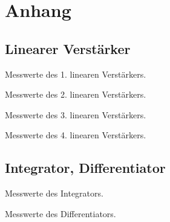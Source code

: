 \section{Anhang}\label{sec:anhang}

\subsection*{Linearer Verst\"arker}

\begin{table}[ht]
  \centering
  \caption{Messwerte des 1. linearen Verstärkers.}
  \label{tab:lin_verst_01}
  
\end{table}

\begin{table}[ht]
  \centering
  \caption{Messwerte des 2. linearen Verstärkers.}
  \label{tab:lin_verst_02}
  
\end{table}

\begin{table}[ht]
  \centering
  \caption{Messwerte des 3. linearen Verstärkers.}
  \label{tab:lin_verst_03}
  
\end{table}

\begin{table}[ht]
  \centering
  \caption{Messwerte des 4. linearen Verstärkers.}
  \label{tab:lin_verst_04}
  
\end{table}

\FloatBarrier
\newpage
\subsection*{Integrator, Differentiator}

\begin{table}[ht]
  \centering
  \caption{Messwerte des Integrators.}
  \label{tab:int}
  
\end{table}

\begin{table}[ht]
  \centering
  \caption{Messwerte des Differentiators.}
  \label{tab:dif}
  
\end{table}

\FloatBarrier
\newpage

